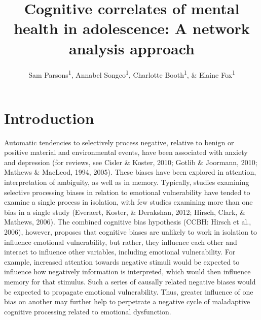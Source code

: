 \documentclass[man,floatsintext]{apa6}
\title{Cognitive correlates of mental health in adolescence: A network analysis approach}
\author{Sam Parsons\textsuperscript{1}, Annabel Songco\textsuperscript{1}, Charlotte Booth\textsuperscript{1}, \& Elaine Fox\textsuperscript{1}}
\date{}
\affiliation{
\vspace{0.5cm}
\textsuperscript{1} University of Oxford}
\begin{document}
\maketitle

\hypertarget{introduction}{%
\section{Introduction}\label{introduction}}

Automatic tendencies to selectively process negative, relative to benign or positive material and environmental events, have been associated with anxiety and depression (for reviews, see Cisler \& Koster, 2010; Gotlib \& Joormann, 2010; Mathews \& MacLeod, 1994, 2005). These biases have been explored in attention, interpretation of ambiguity, as well as in memory. Typically, studies examining selective processing biases in relation to emotional vulnerability have tended to examine a single process in isolation, with few studies examining more than one bias in a single study (Everaert, Koster, \& Derakshan, 2012; Hirsch, Clark, \& Mathews, 2006). The combined cognitive bias hypothesis (CCBH: Hirsch et al., 2006), however, proposes that cognitive biases are unlikely to work in isolation to influence emotional vulnerability, but rather, they influence each other and interact to influence other variables, including emotional vulnerability. For example, increased attention towards negative stimuli would be expected to influence how negatively information is interpreted, which would then influence memory for that stimulus. Such a series of causally related negative biases would be expected to propagate emotional vulnerability. Thus, greater influence of one bias on another may further help to perpetrate a negative cycle of maladaptive cognitive processing related to emotional dysfunction.
\end{document}
